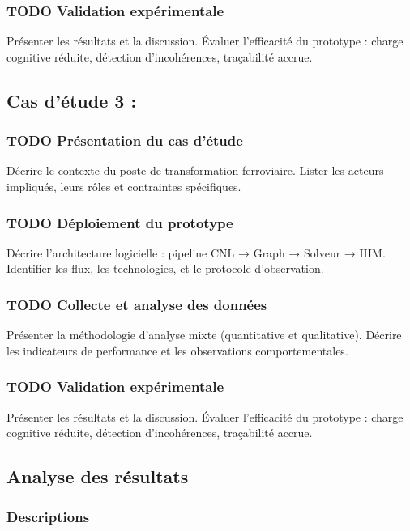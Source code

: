 \documentclass[a4paper,12pt]{article}
\begin{document}
\subsubsection{{\bfseries\sffamily TODO} Validation expérimentale}
\label{sec:orgb3b1701}
Présenter les résultats et la discussion.  
Évaluer l’efficacité du prototype : charge cognitive réduite, détection d’incohérences, traçabilité accrue.
\subsection{Cas d'étude 3 :}
\label{sec:orgaade1af}
\subsubsection{{\bfseries\sffamily TODO} Présentation du cas d’étude}
\label{sec:org2d4e361}
Décrire le contexte du poste de transformation ferroviaire.  
Lister les acteurs impliqués, leurs rôles et contraintes spécifiques.
\subsubsection{{\bfseries\sffamily TODO} Déploiement du prototype}
\label{sec:org795f976}
Décrire l’architecture logicielle : pipeline CNL → Graph → Solveur → IHM.  
Identifier les flux, les technologies, et le protocole d’observation.
\subsubsection{{\bfseries\sffamily TODO} Collecte et analyse des données}
\label{sec:org177a415}
Présenter la méthodologie d’analyse mixte (quantitative et qualitative).  
Décrire les indicateurs de performance et les observations comportementales.
\subsubsection{{\bfseries\sffamily TODO} Validation expérimentale}
\label{sec:org149ca03}
Présenter les résultats et la discussion.  
Évaluer l’efficacité du prototype : charge cognitive réduite, détection d’incohérences, traçabilité accrue.
\subsection{Analyse des résultats}
\label{sec:org3455003}
\subsubsection{Descriptions}
\label{sec:org21b7c02}
\end{document}
